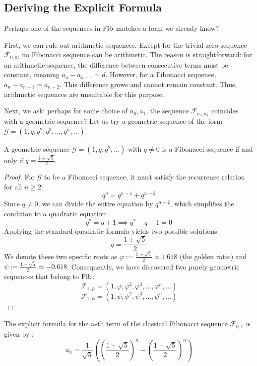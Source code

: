 \subsection{Deriving the Explicit Formula}

Perhaps one of the sequences in $\operatorname{Fib}$ matches a form we already know? 

First, we can rule out arithmetic sequences. Except for the trivial zero sequence $\mathcal{F}_{0,0}$, no Fibonacci sequence can be arithmetic. The reason is straightforward: for an arithmetic sequence, the difference between consecutive terms must be constant, meaning $a_n - a_{n-1} = d$. However, for a Fibonacci sequence, $a_n - a_{n-1} = a_{n-2}$. This difference grows and cannot remain constant. Thus, arithmetic sequences are unsuitable for this purpose.

Next, we ask: perhaps for some choice of $a_0, a_1$, the sequence $\mathcal{F}_{a_0, a_1}$ coincides with a geometric sequence? Let us try a geometric sequence of the form $\mathcal{G} = (1, q, q^2, q^3, \dots, q^n, \dots)$. 

\begin{lemma}
A geometric sequence $\mathcal{G} = (1, q, q^2, \dots)$ with $q \ne 0$ is a Fibonacci sequence if and only if $q = \frac{1 \pm \sqrt{5}}{2}$.
\end{lemma}

\begin{proof}
For $\mathcal{G}$ to be a Fibonacci sequence, it must satisfy the recurrence relation for all $n \ge 2$:
\[
q^n = q^{n-1} + q^{n-2}
\]
Since $q \ne 0$, we can divide the entire equation by $q^{n-2}$, which simplifies the condition to a quadratic equation:
\[
q^2 = q + 1 \implies q^2 - q - 1 = 0
\]
Applying the standard quadratic formula yields two possible solutions:
\[
q = \frac{1 \pm \sqrt{5}}{2}
\]
We denote these two specific roots as $\varphi := \frac{1 + \sqrt{5}}{2} \approx 1.618$ (the golden ratio) and $\psi := \frac{1 - \sqrt{5}}{2} \approx -0.618$. Consequently, we have discovered two purely geometric sequences that belong to $\operatorname{Fib}$:
\[
\mathcal{F}_{1, \varphi} = (1, \varphi, \varphi^2, \varphi^3, \dots, \varphi^n, \dots)
\]
\[
\mathcal{F}_{1, \psi} = (1, \psi, \psi^2, \psi^3, \dots, \psi^n, \dots)
\]
\end{proof}

\begin{theorem}
\label{thm:binet_formula}
The explicit formula for the $n$-th term of the classical Fibonacci sequence $\mathcal{F}_{0,1}$ is given by :
\[
a_n = \frac{1}{\sqrt{5}} \left( \left(\frac{1+\sqrt{5}}{2}\right)^n - \left(\frac{1-\sqrt{5}}{2}\right)^n \right)
\]
\end{theorem}

